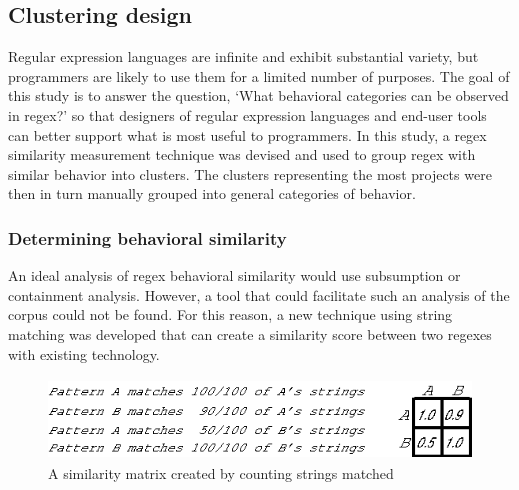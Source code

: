 \subsection{Clustering design}
\label{sec:clusteringDesign}

Regular expression languages are infinite and exhibit substantial variety, but programmers are likely to use them for a limited number of purposes.  The goal of this study is to answer the question, `What behavioral categories can be observed in regex?' so that designers of regular expression languages and end-user tools can better support what is most useful to programmers.  In this study, a regex similarity measurement technique was devised and used to group regex with similar behavior into clusters.  The clusters representing the most projects were then in turn manually grouped into general categories of behavior.


\subsubsection{Determining behavioral similarity}
An ideal analysis of regex behavioral similarity would use subsumption or containment analysis. However, a tool that could facilitate such an analysis of the corpus could not be found.  For this reason, a new technique using string matching was developed that can create a similarity score between two regexes with existing technology.

\begin{figure}[tb]
\centering
\includegraphics[height=0.85in]{nontex/illustrations/minimalMatrix.eps}
\caption{A similarity matrix created by counting strings matched}
\label{fig:minimalMatrix}
\end{figure}

